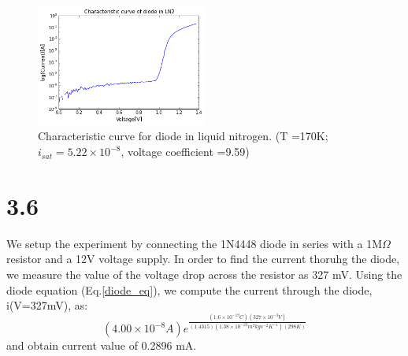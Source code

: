 \documentclass[authoryear, 12pt,5p, times]{elsarticle}
\begin{document}
\begin{figure}[h!]
\center
\includegraphics[width=0.5\textwidth]{figure/3_5_ln2}
\caption{Characteristic curve for diode in liquid nitrogen. (T =170K; $i_{sat}=5.22\times10^{-8}$, voltage coefficient =9.59)}
\label{3_5_ln2}
\end{figure}
\section*{3.6}
We setup the experiment by connecting the 1N4448 diode in series with a 1M$\Omega$ resistor and a 12V voltage supply. In order to find the current thoruhg the diode, we measure the value of the voltage drop across the resistor as 327 mV. Using the diode equation (Eq.\ref{diode_eq}), we compute the current through the diode, i(V=327mV), as: 
\begin{equation*}
(4.00\times10^{-8}A)e^{\frac{(1.6\times10^{-19}C)(327\times10^{-3}V)}{(1.4315)(1.38\times10^{-23}m^2kgs^{-2}K^{-1})(298K)}}
\end{equation*}
and obtain current value of 0.2896 mA.
\end{document}
